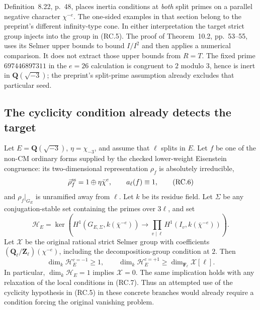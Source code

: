 Definition~8.22, p.~48, places inertia conditions at
\emph{both} split primes on a parallel negative character
$\chi^{-e}$.  The one-sided examples in that section
belong to the preprint's different infinity-type cone.
In either interpretation the target strict group injects
into the group in (RC.5).  The proof of Theorem~10.2,
pp.~53--55, uses its Selmer upper bounds to bound
$I/I^2$ and then applies a numerical comparison.
It does not extract those upper bounds from $R=T$.
The fixed prime $697446897311$ in the $e=26$ calculation
is congruent to $2$ modulo $3$, hence is inert in
$\mathbf Q(\sqrt{-3})$; the preprint's split-prime
assumption already excludes that particular seed.

\subsection{The cyclicity condition already detects the target}

\begin{theorem}
Let $E=\mathbf Q(\sqrt{-3})$, $\eta=\chi_{-3}$,
and assume that $\ell$ splits in $E$.  Let $f$ be one
of the non-CM ordinary forms supplied by the checked
lower-weight Eisenstein congruence: its two-dimensional
representation $\rho_f$ is absolutely irreducible,
\[
 \bar\rho_f^{\rm ss}=1\oplus\eta\bar\chi^e,
 \qquad a_\ell(f)\equiv1,
                                                               \tag{RC.6}
\]
and $\rho_f|_{G_E}$ is unramified away from $\ell$.
Let $k$ be its residue field.  Let $\Sigma$ be any
conjugation-stable set containing the primes over
$3\ell$, and set
\[
 \mathcal H_E=
 \ker\left(H^1(G_{E,\Sigma},k(\bar\chi^{-e}))
       \longrightarrow\prod_{v\mid\ell}
                         H^1(I_v,k(\bar\chi^{-e}))\right).
                                                               \tag{RC.7}
\]
Let $\mathcal X$ be the original rational strict
Selmer group with coefficients
$(\mathbf Q_\ell/\mathbf Z_\ell)(\chi^{-e})$,
including the decomposition-group condition at $2$.
Then
\[
 \dim_k\mathcal H_E^{c=-1}\geq1,\qquad
 \dim_k\mathcal H_E^{c=+1}
          \geq\dim_{\mathbf F_\ell}\mathcal X[\ell].
                                                               \tag{RC.8}
\]
In particular, $\dim_k\mathcal H_E=1$ implies
$\mathcal X=0$.  The same implication holds with any
relaxation of the local conditions in (RC.7).
Thus an attempted use of the cyclicity hypothesis in
(RC.5) in these concrete branches would already require
a condition forcing the original vanishing problem.
\end{theorem}

